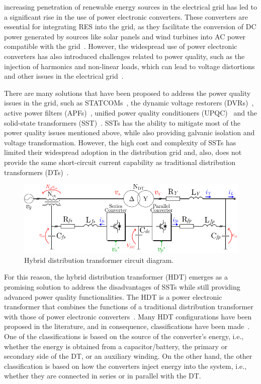  increasing penetration of renewable energy sources in the electrical grid has led to a significant rise in the use of power electronic converters. These converters are essential for integrating RES into the grid, as they facilitate the conversion of DC power generated by sources like solar panels and wind turbines into AC power compatible with the grid~\cite{Blaabjerg2023}. However, the widespread use of power electronic converters has also introduced challenges related to power quality, such as the injection of harmonics and non-linear loads, which can lead to voltage distortions and other issues in the electrical grid~\cite{Najafzadeh2021,Sepasi2023}.

There are many solutions that have been proposed to address the power quality issues in the grid, such as STATCOMs~\cite{Engelbrecht2023}, the dynamic voltage restorers (DVRs)~\cite{Kandil2020}, active power filters (APFs)~\cite{Mishra2020}, unified power quality conditioners (UPQC)~\cite{Fujita1998} and the solid-state transformers (SST)~\cite{Huber2019}. SSTs has the ability to mitigate most of the power quality issues mentioned above, while also providing galvanic isolation and voltage transformation. However, the high cost and complexity of SSTs has limited their widespread adoption in the distribution grid and, also, does not provide the same short-circuit current capability as traditional distribution transformers (DTs)~\cite{carrenoConfigurationsPowerTopologies2021}.

\begin{figure}[t!]
    \centering
    \includegraphics[width=\textwidth]{Images/HDT_Diagram.pdf} 
    \caption{Hybrid distribution transformer circuit diagram.}
    \label{fig:HDT_Transformer}
\end{figure}

For this reason, the hybrid distribution transformer (HDT) emerges as a promising solution to address the disadvantages of SSTs while still providing advanced power quality functionalities.
The HDT is a power electronic transformer that combines the functions of a traditional distribution transformer with those of power electronic converters~\cite{haj-maharsiHybridDistributionTransformer2010,matelskiBadaniaEksperymentalneTransformatora2023}. Many HDT configurations have been proposed in the literature, and in consequence, classifications have been made~\cite{carrenoConfigurationsPowerTopologies2021}. One of the classifications is based on the source of the converter's energy, i.e., whether the energy is obtained from a capacitor/battery, the primary or secondary side of the DT, or an auxiliary winding. On the other hand, the other classification is based on how the converters inject energy into the system, i.e., whether they are connected in series or in parallel with the DT. 

